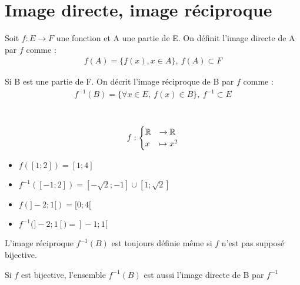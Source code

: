 \section{Image directe, image réciproque}

\begin{graybox}
	\begin{definition}
		Soit $f : E \to F$ une fonction et A une partie de E.
		On définit l'image directe de A par $f$ comme :
		\begin{align*}
			f(A) = \{f(x), x \in A\},\ f(A) \subset F
		\end{align*}
	\end{definition}
\end{graybox}

\begin{graybox}
	\begin{definition}
		Si B est une partie de F. On décrit l'image réciproque de B par $f$ comme :
		\begin{align*}
			f^{-1}(B) = \{\forall x \in E,\ f(x) \in B\},\ f^{-1} \subset E
		\end{align*}
	\end{definition}
\end{graybox}

\begin{exemple}~
	\begin{align*}
		f:
		\begin{cases}
			\mathbb{R} &\to \mathbb{R} \\
			x &\mapsto x^2
		\end{cases}
	\end{align*}
	\begin{itemize}
		\item $f([1;2]) = [1;4]$
		\item $f^{-1}([-1;2]) = [-\sqrt{2};-1]\cup[1;\sqrt{2}]$
		\item $f(]-2;1[) = [0;4[$
		\item $f^{-1}(]-2;1[) = ]-1;1[$ 
	\end{itemize}
\end{exemple}

\begin{remarque}
	L'image réciproque $f^{-1}(B)$ est toujours définie même si $f$ n'est pas supposé bijective.
\end{remarque}

\begin{remarque}
	Si $f$ est bijective, l'ensemble $f^{-1}(B)$ est aussi l'image directe de B par $f^{-1}$
\end{remarque}


